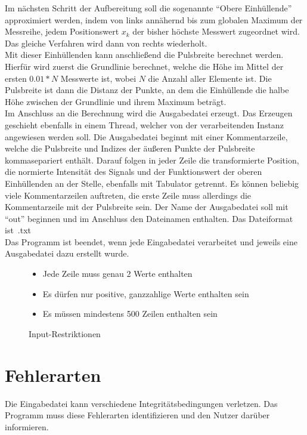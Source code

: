 Im nächsten Schritt der Aufbereitung soll die sogenannte \enquote{Obere Einhüllende} approximiert werden, indem von links annähernd bis zum globalen Maximum der Messreihe, jedem Positionswert $x_k$ der bisher höchste Messwert zugeordnet wird.
Das gleiche Verfahren wird dann von rechts wiederholt.\\
Mit dieser Einhüllenden kann anschließend die Pulsbreite berechnet werden.
Hierfür wird zuerst die Grundlinie berechnet, welche die Höhe im Mittel der ersten $0.01 * N$ Messwerte ist, wobei $N$ die Anzahl aller Elemente ist.
Die Pulsbreite ist dann die Distanz der Punkte, an dem die Einhüllende die halbe Höhe zwischen der Grundlinie und ihrem Maximum beträgt.\\

Im Anschluss an die Berechnung wird die Ausgabedatei erzeugt.
Das Erzeugen geschieht ebenfalls in einem Thread, welcher von der verarbeitenden Instanz angewiesen werden soll.
Die Ausgabedatei beginnt mit einer Kommentarzeile, welche die Pulsbreite und Indizes der äußeren Punkte der Pulsbreite kommasepariert enthält.
Darauf folgen in jeder Zeile die transformierte Position, die normierte Intensität des Signals und der Funktionswert der oberen Einhüllenden an der Stelle, ebenfalls mit Tabulator getrennt.
Es können beliebig viele Kommentarzeilen auftreten, die erste Zeile muss allerdings die Kommentarzeile mit der Pulsbreite sein.
Der Name der Ausgabedatei soll mit \enquote{out} beginnen und im Anschluss den Dateinamen enthalten.
Das Dateiformat ist~.txt\\
Das Programm ist beendet, wenn jede Eingabedatei verarbeitet und jeweils eine Ausgabedatei dazu erstellt wurde.

\begin{figure}[h]
    \centering
    \caption{Input-Restriktionen}
    \begin{itemize}[noitemsep]
        \item Jede Zeile muss genau 2 Werte enthalten
        \item Es dürfen nur positive, ganzzahlige Werte enthalten sein
        \item Es müssen mindestens 500 Zeilen enthalten sein
    \end{itemize}
    \label{fig:input-restrictions}
\end{figure}


\section{Fehlerarten}\label{sec:fehlerarten}
Die Eingabedatei kann verschiedene Integritätsbedingungen verletzen.
Das Programm muss diese Fehlerarten identifizieren und den Nutzer darüber informieren.

